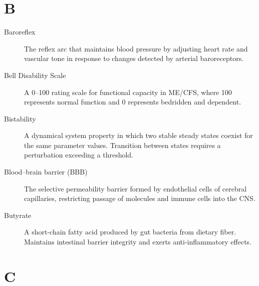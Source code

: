 \section*{B}

\begin{description}
\item[Baroreflex] The reflex arc that maintains blood pressure by adjusting heart rate and vascular tone in response to changes detected by arterial baroreceptors.
\item[Bell Disability Scale] A 0--100 rating scale for functional capacity in ME/CFS, where 100 represents normal function and 0 represents bedridden and dependent.
\item[Bistability] A dynamical system property in which two stable steady states coexist for the same parameter values. Transition between states requires a perturbation exceeding a threshold.
\item[Blood--brain barrier (BBB)] The selective permeability barrier formed by endothelial cells of cerebral capillaries, restricting passage of molecules and immune cells into the CNS.
\item[Butyrate] A short-chain fatty acid produced by gut bacteria from dietary fiber. Maintains intestinal barrier integrity and exerts anti-inflammatory effects.
\end{description}

\section*{C}

